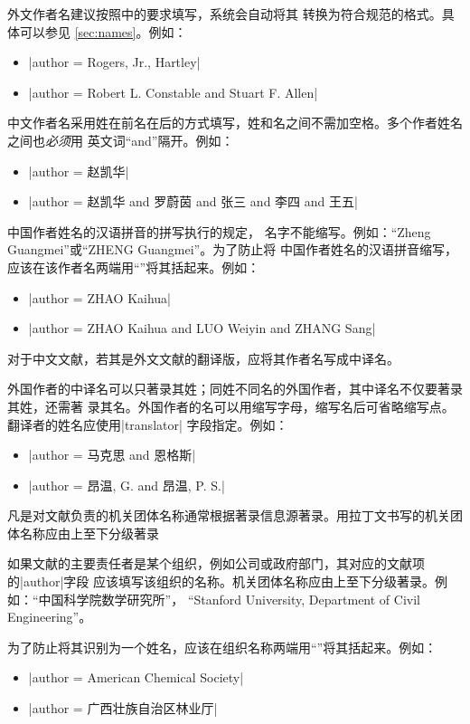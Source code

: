 外文作者名建议按照\cite[157]{lamport1994latex}中的要求填写，{\BibTeX}系统会自动将其
转换为符合规范\cite{gbt7714-2005}的格式。具体可以参见
\ref{sec:names}。例如：
\begin{itemize}
\item |author = {Rogers, Jr., Hartley}|
\item |author = {Robert L. Constable and Stuart F. Allen}|
\end{itemize}

中文作者名采用姓在前名在后的方式填写，姓和名之间不需加空格。多个作者姓名之间也\emph{必须}用
英文词``and''隔开。例如：
\begin{itemize}
\item |author = {赵凯华}|
\item |author = {赵凯华 and 罗蔚茵 and 张三 and 李四 and 王五}|
\end{itemize}

中国作者姓名的汉语拼音的拼写执行的规定\cite{gbt16159-2012}，
名字不能缩写。例如：``Zheng Guangmei''或``ZHENG Guangmei''。为了防止{\BibTeX}将
中国作者姓名的汉语拼音缩写，应该在该作者名两端用``{}''将其括起来。例如：
\begin{itemize}
\item |author = {{ZHAO Kaihua}}|
\item |author = {{ZHAO Kaihua} and {LUO Weiyin} and {ZHANG Sang}}|
\end{itemize}

对于中文文献，若其是外文文献的翻译版，应将其作者名写成中译名。

外国作者的中译名可以只著录其姓；同姓不同名的外国作者，其中译名不仅要著录其姓，还需著
录其名。外国作者的名可以用缩写字母，缩写名后可省略缩写点。翻译者的姓名应使用|translator|
字段指定。例如：
\begin{itemize}
\item |author = {马克思 and 恩格斯}|
\item |author = {昂温, G. and 昂温, P. S.}|
\end{itemize}

凡是对文献负责的机关团体名称通常根据著录信息源著录。用拉丁文书写的机关团体名称应由上至下分级著录 

如果文献的主要责任者是某个组织，例如公司或政府部门，其对应的文献项的|author|字段
应该填写该组织的名称。机关团体名称应由上至下分级著录。例如：``中国科学院数学研究所''，
``Stanford University, Department of Civil Engineering''。

为了防止{\BibLaTeX}将其识别为一个姓名，应该在组织名称两端用``{}''将其括起来。例如：
\begin{itemize}
\item |author = {{American Chemical Society}}|
\item |author = {{广西壮族自治区林业厅}}|
\end{itemize}

